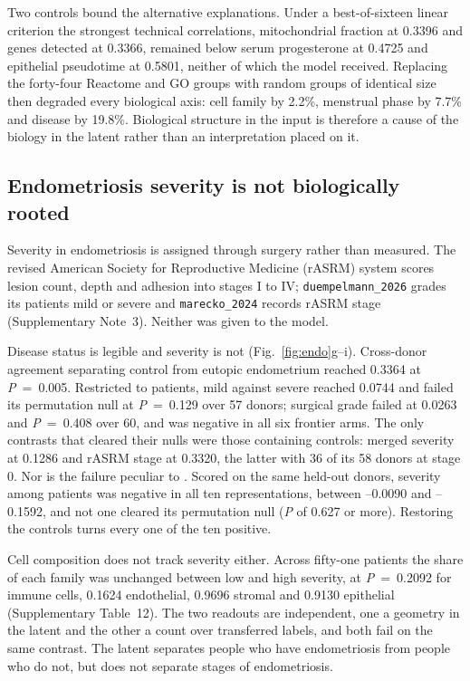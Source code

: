 Two controls bound the alternative explanations. Under a best-of-sixteen
linear criterion the strongest technical correlations, mitochondrial fraction
at 0.3396 and genes detected at 0.3366, remained below serum progesterone at
0.4725 and epithelial pseudotime at 0.5801, neither of which the model
received. Replacing the forty-four Reactome and GO groups with random groups of
identical size then degraded every biological axis: cell family by 2.2\%,
menstrual phase by 7.7\% and disease by 19.8\%. Biological structure in the
input is therefore a cause of the biology in the latent rather than an
interpretation placed on it.

\subsection*{Endometriosis severity is not biologically rooted}

Severity in endometriosis is assigned through surgery rather than measured. The
revised American Society for Reproductive Medicine (rASRM) system scores lesion
count, depth and adhesion into stages I to IV; \texttt{duempelmann\_2026}
grades its patients mild or severe and \texttt{marecko\_2024} records rASRM
stage (Supplementary Note~3). Neither was given to the model.

Disease status is legible and severity is not (Fig.~\ref{fig:endo}g--i). Cross-donor agreement
separating control from eutopic endometrium reached 0.3364 at \textit{P}~=~0.005.
Restricted to patients, mild against severe reached 0.0744 and failed its
permutation null at \textit{P}~=~0.129 over 57 donors; surgical grade failed at
0.0263 and \textit{P}~=~0.408 over 60, and was negative in all six frontier arms.
The only contrasts that cleared their nulls were those
containing controls: merged severity at 0.1286 and rASRM stage at 0.3320,
the latter with 36 of its 58 donors at stage 0. Nor is the failure peculiar
to \elaj{}. Scored on the same held-out donors, severity among patients was
negative in all ten representations, between --0.0090 and --0.1592, and
not one cleared its permutation null (\textit{P} of 0.627 or more). Restoring the
controls turns every one of the ten positive.

Cell composition does not track severity either. Across fifty-one patients
the share of each family was unchanged between low and high severity, at
\textit{P}~=~0.2092 for immune cells, 0.1624 endothelial, 0.9696 stromal and 0.9130
epithelial (Supplementary Table~12). The two readouts are independent, one a geometry in the
latent and the other a count over transferred labels, and both fail on the
same contrast. The latent separates people who have endometriosis from
people who do not, but does not separate stages of endometriosis.


